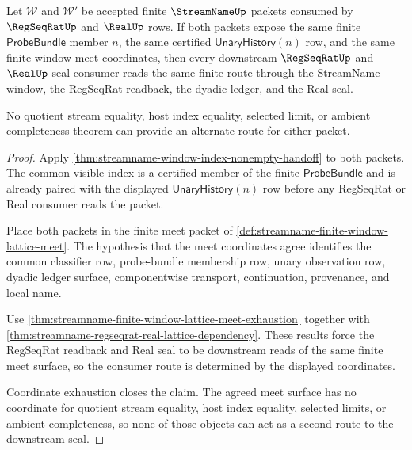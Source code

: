 \begin{theorem}
\label{thm:streamname-window-index-route-determinacy}
Let $\mathcal W$ and $\mathcal W'$ be accepted finite $\StreamNameUp$ packets
consumed by $\RegSeqRatUp$ and $\RealUp$ rows. If both packets expose the same
finite $\mathsf{ProbeBundle}$ member $n$, the same certified
$\mathsf{UnaryHistory}(n)$ row, and the same finite-window meet coordinates,
then every downstream $\RegSeqRatUp$ and $\RealUp$ seal consumer reads the
same finite route through the StreamName window, the RegSeqRat readback, the
dyadic ledger, and the Real seal.

No quotient stream equality, host index equality, selected limit, or ambient
completeness theorem can provide an alternate route for either packet.
\end{theorem}
\begin{proof}
Apply \autoref{thm:streamname-window-index-nonempty-handoff} to both packets.
The common visible index is a certified member of the finite
$\mathsf{ProbeBundle}$ and is already paired with the displayed
$\mathsf{UnaryHistory}(n)$ row before any RegSeqRat or Real consumer reads the
packet.

Place both packets in the finite meet packet of
\autoref{def:streamname-finite-window-lattice-meet}. The hypothesis that the
meet coordinates agree identifies the common classifier row, probe-bundle
membership row, unary observation row, dyadic ledger surface, componentwise
transport, continuation, provenance, and local name.

Use \autoref{thm:streamname-finite-window-lattice-meet-exhaustion} together
with \autoref{thm:streamname-regseqrat-real-lattice-dependency}. These results
force the RegSeqRat readback and Real seal to be downstream reads of the same
finite meet surface, so the consumer route is determined by the displayed
coordinates.

Coordinate exhaustion closes the claim. The agreed meet surface has no
coordinate for quotient stream equality, host index equality, selected
limits, or ambient completeness, so none of those objects can act as a second
route to the downstream seal.
\end{proof}

